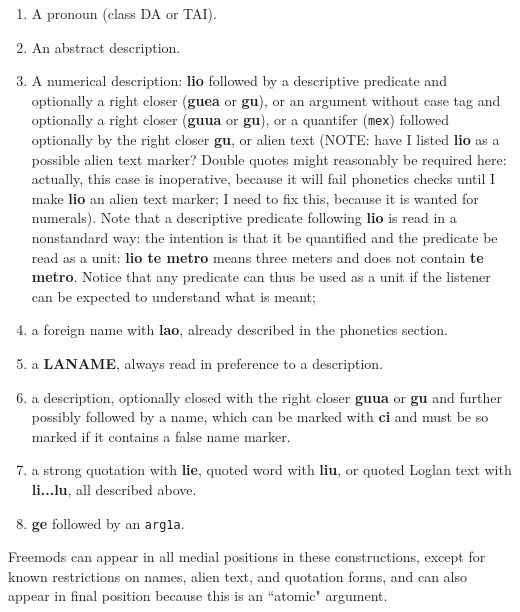 \documentclass[12pt]{book}
\begin{document}
\begin{enumerate}

\item A pronoun (class DA or TAI).

\item An abstract description.

\item A numerical description:  {\bf lio} followed by a descriptive predicate and optionally a right closer ({\bf guea} or {\bf gu}), or an argument without case tag and optionally a right closer ({\bf guua} or {\bf gu}), or a quantifer ({\tt mex}) followed optionally by the right closer {\bf gu}, or alien text (NOTE:  have I listed {\bf lio} as a possible alien text marker?  Double quotes might reasonably be required here:  actually, this case is inoperative, because it will fail phonetics checks until I make {\bf lio} an alien text marker; I need to fix this, because it is wanted for numerals).  Note that a descriptive predicate following {\bf lio} is read in a nonstandard way: the intention is that it be quantified and the predicate be read as a unit:  {\bf lio te metro} means three meters and does not contain {\bf te metro}.  Notice that any predicate can thus be used as a unit if the listener can be expected to understand what is meant;

\item a foreign name with {\bf lao}, already described in the phonetics section.

\item a {\bf LANAME}, always read in preference to a description.

\item a description, optionally closed with  the right closer {\bf guua} or {\bf gu} and further possibly followed by a name, which can be marked with {\bf ci} and must be so marked if it contains a false name marker.

\item  a strong quotation with {\bf lie}, quoted word with {\bf liu}, or quoted Loglan text with {\bf li...lu}, all described above.

\item {\bf ge} followed by an {\tt arg1a}.


\end{enumerate}

Freemods can appear in all medial positions in these constructions, except for known restrictions on names, alien text, and quotation forms, and can also appear in final position
because this is an ``atomic" argument.
\end{document}
